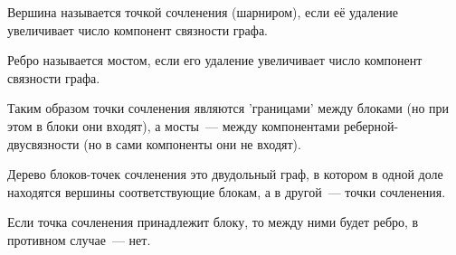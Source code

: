 \begin{definition}
  Вершина называется точкой сочленения (шарниром), если её удаление увеличивает
  число компонент связности графа.
\end{definition}

\begin{definition}
  Ребро называется мостом, если его удаление увеличивает число компонент
  связности графа.
\end{definition}

\begin{remark}
  Таким образом точки сочленения являются 'границами' между блоками (но при
  этом в блоки они входят), а мосты~--- между компонентами
  реберной-двусвязности (но в сами компоненты они не входят).
\end{remark}

\begin{definition}
  Дерево блоков-точек сочленения это двудольный граф, в котором в одной доле
  находятся вершины соответствующие блокам, а в другой~--- точки сочленения.

  Если точка сочленения принадлежит блоку, то между ними будет ребро, в
  противном случае~--- нет.
\end{definition}

